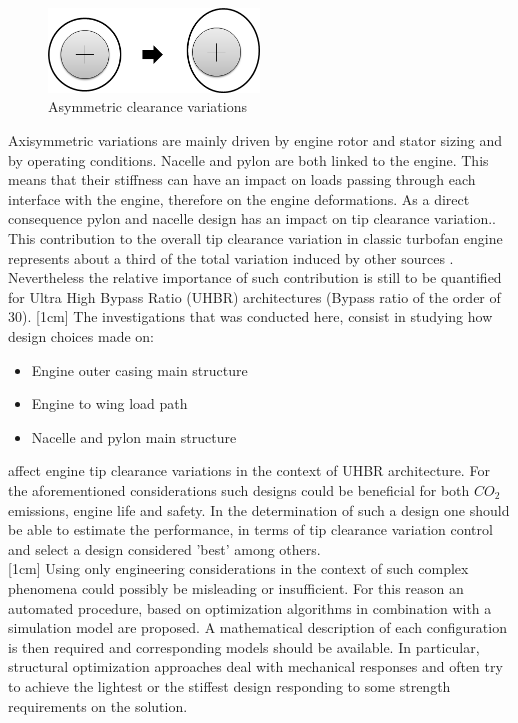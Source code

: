 \begin{figure}[!ht]
\centering   
 \includegraphics[width=0.5\textwidth]{images/intro/asym_tip}
     \caption{Asymmetric clearance variations} 
     \label{fig.intro4}
\end{figure}
Axisymmetric variations are mainly driven by engine rotor and stator sizing and by operating conditions. Nacelle and pylon are both linked to the engine. This means that their stiffness can have an impact on loads passing through each interface with the engine, therefore on the engine deformations. As a direct consequence pylon and nacelle design has an impact on tip clearance variation.\cite{lattime2002turbine}.  This contribution to the overall tip clearance variation in classic turbofan engine represents about a third of the total variation induced by other sources \cite{lattime2002turbine}. Nevertheless the relative importance of such contribution is still to be quantified for Ultra High Bypass Ratio (UHBR) architectures (Bypass ratio of the order of 30).\newpage
{}[1cm] 
 The investigations that was conducted here, consist in studying how design choices made on:
 \begin{itemize}
 \item Engine outer casing main structure
 \item Engine to wing load path
 \item Nacelle and pylon main structure
 \end{itemize}
affect engine tip clearance variations in the context of UHBR architecture. For the aforementioned considerations such designs could be beneficial for both $CO_2$ emissions, engine life and safety. 
 In the determination of such a design one should be able to estimate the performance, in terms of tip clearance variation control and select a design considered 'best' among others.\\ 
 [1cm]
 Using only engineering considerations in the context of such complex phenomena could possibly be misleading or insufficient. For this reason an automated procedure, based on optimization algorithms in combination with a simulation model are proposed. A mathematical description of each configuration is then required and corresponding models should be available. In particular, structural optimization approaches deal with mechanical responses and often try to achieve the lightest or the stiffest design responding to some strength requirements on the solution. \\
